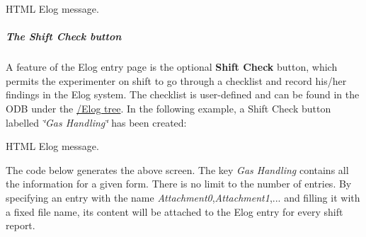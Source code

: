 \par
\par
\par
 \begin{center}  HTML Elog message. \par
\par
\par
  \end{center}  \par
\par
\par
\hypertarget{RC_mhttpd_Elog_page_RC_mhttpd_Internal_Elog_shift_check}{}\subparagraph{The Shift Check button}\label{RC_mhttpd_Elog_page_RC_mhttpd_Internal_Elog_shift_check}
\label{RC_mhttpd_Elog_page_idx_elog_shift-check-form}
\hypertarget{RC_mhttpd_Elog_page_idx_elog_shift-check-form}{}



\begin{DoxyItemize}
\item A feature of the Elog entry page is the optional {\bfseries Shift Check} button, which permits the experimenter on shift to go through a checklist and record his/her findings in the Elog system. The checklist is user-\/defined and can be found in the ODB under the \hyperlink{F_Elog_F_ODB_Elog_Tree}{/Elog tree}. In the following example, a Shift Check button labelled {\itshape \char`\"{}Gas Handling\char`\"{}\/} has been created:
\end{DoxyItemize}

\par
\par
\par
 \begin{center}  HTML Elog message. \par
\par
\par
  \end{center}  \par
\par
\par



\begin{DoxyItemize}
\item The code below generates the above screen. The key {\itshape Gas Handling\/} contains all the information for a given form. There is no limit to the number of entries. By specifying an entry with the name {\itshape Attachment0\/},{\itshape Attachment1\/},... and filling it with a fixed file name, its content will be attached to the Elog entry for every shift report.
\end{DoxyItemize}


